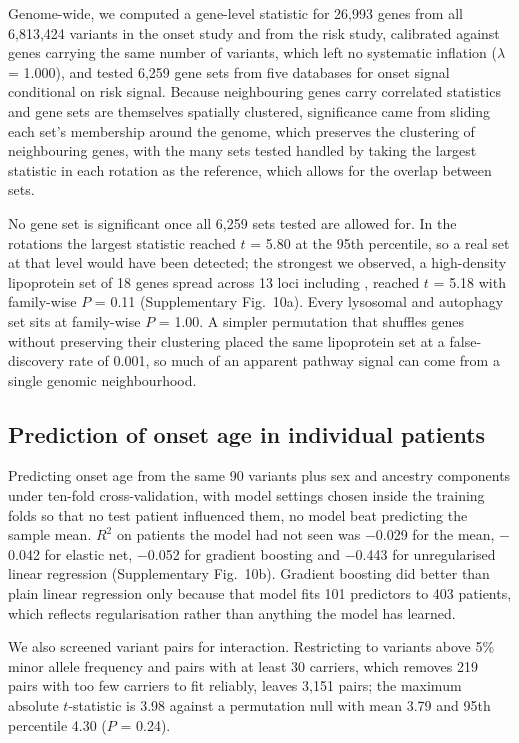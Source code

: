 \documentclass[10pt]{article}
\begin{document}
Genome-wide, we computed a gene-level statistic for 26,993 genes from all 6,813,424 variants in
the onset study and from the risk study, calibrated against genes carrying the same number of variants, which left no systematic inflation ($\lambda$ = 1.000), and tested 6,259 gene sets from five databases for onset
signal conditional on risk signal. Because neighbouring genes carry correlated statistics and gene
sets are themselves spatially clustered, significance came from sliding each set's membership around the genome, which preserves the clustering of neighbouring genes, with the many sets tested handled by taking the largest statistic in each rotation as the reference, which allows for the overlap between sets.

No gene set is significant once all 6,259 sets tested are allowed for. In the rotations the largest statistic reached $t$ = 5.80 at the 95th percentile, so a real set at that level would have been detected; the strongest we observed, a high-density lipoprotein set of 18 genes spread across 13 loci including , reached $t$ = 5.18 with family-wise $P$ = 0.11 (Supplementary Fig.~10a). Every lysosomal and autophagy set
sits at family-wise $P$ = 1.00. A simpler permutation that shuffles genes without preserving their clustering placed the same lipoprotein set at a false-discovery rate of 0.001, so much of an apparent pathway signal can come from a single genomic neighbourhood.

\subsection*{Prediction of onset age in individual patients}

Predicting onset age from the same 90 variants plus sex and ancestry components under ten-fold cross-validation, with model settings chosen inside the training folds so that no test patient influenced them, no model beat predicting
the sample mean. $R^2$ on patients the model had not seen was $-$0.029 for the mean, $-$0.042 for elastic net, $-$0.052 for
gradient boosting and $-$0.443 for unregularised linear regression (Supplementary Fig.~10b). Gradient boosting did better than plain linear regression only because that model fits 101 predictors to 403 patients, which reflects regularisation rather than anything the model has learned.

We also screened variant pairs for interaction. Restricting to variants above 5\% minor
allele frequency and pairs with at least 30 carriers, which removes 219 pairs with too few carriers to fit reliably, leaves 3,151 pairs; the maximum absolute $t$-statistic is 3.98 against a permutation null
with mean 3.79 and 95th percentile 4.30 ($P$ = 0.24).
\end{document}
